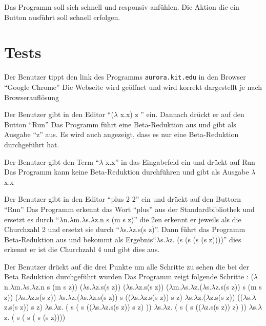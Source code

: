 \documentclass[parskip=full,11pt,twoside]{scrartcl}
\begin{document}
Das Programm soll sich schnell und responsiv anfühlen. Die Aktion die ein Button ausführt soll schnell erfolgen. 


\section{Tests}


{Der Benutzer tippt den link des Programms \texttt{aurora.kit.edu} in den Browser \enquote {Google Chrome} }
{ Die Webseite wird geöffnet und wird korrekt dargestellt je nach Browserauflösung}

{ Der Benutzer gibt in den Editor \enquote {($\lambda$ x.x) z } ein. Dannach drückt er auf den Button \enquote {Run}}
{ Das Programm führt eine Beta-Reduktion aus und gibt als Ausgabe \enquote {z} aus. Es wird auch angezeigt, dass es nur eine Beta-Reduktion durchgeführt hat.}

{Der Benutzer gibt den Term \enquote {$\lambda$ x.x} in das Eingabefeld ein und drückt auf Run}
{Das Programm kann keine Beta-Reduktion durchführen und gibt als Ausgabe $\lambda$ x.x}

{Der Benutzer gibt in den Editor \enquote {plus 2 2} ein und drückt auf den Buttorn \enquote {Run}}
{ Das Programm erkennt das Wort \enquote {plus} aus der Standardbibliothek und ersetzt es durch \enquote {$\lambda$n.$\lambda$m.$\lambda$s.$\lambda$z.n s (m s z)} die 2en erkennt er jeweils als die Churchzahl 2 und ersetzt sie durch \enquote {$\lambda$s.$\lambda$z.s(s z)}. Dann führt das Programm Beta-Reduktion aus und bekommt als Ergebnis\enquote {$\lambda$s.$\lambda$z. (s (s (s (s z))))} dies erkennt er ist die Churchzahl 4 und gibt dies aus. }

{ Der Benutzer drückt auf die drei Punkte um alle Schritte zu sehen die bei der Beta Reduktion durchgeführt wurden }
{ Das Programm zeigt folgende Schritte :
\newline ($\lambda$n.$\lambda$m.$\lambda$s.$\lambda$z.n s (m s z)) ($\lambda$s.$\lambda$z.s(s z)) ($\lambda$s.$\lambda$z.s(s z))
\newline ($\lambda$m.$\lambda$s.$\lambda$z.($\lambda$s.$\lambda$z.s(s z)) s (m s z)) ($\lambda$s.$\lambda$z.s(s z))
\newline $\lambda$s.$\lambda$z.($\lambda$s.$\lambda$z.s(s z)) s (($\lambda$s.$\lambda$z.s(s z)) s z)
\newline $\lambda$s.$\lambda$z.($\lambda$z.s(s z)) (($\lambda$s.$\lambda$z.s(s z)) s z)
\newline $\lambda$s.$\lambda$z. ( s ( s (($\lambda$s.$\lambda$z.s(s z)) s z) ))
\newline $\lambda$s.$\lambda$z. ( s ( s (($\lambda$z.s(s z)) z) ))
\newline $\lambda$s.$\lambda$z. ( s ( s ( s (s z))))
 }
\end{document}
